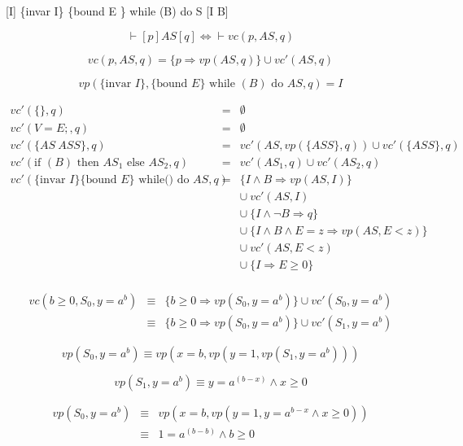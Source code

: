 \documentclass[12pt, a4paper]{book}
\begin{document}
  {[I] \{\textrm{invar }I\} \{\textrm{bound }E \}\textrm{ while }(B)\textrm{ do }S [I \land \lnot B]}

  $$\vdash [p] AS [q] \iff \vdash vc(p,AS,q)$$

  $$vc(p, AS, q) = \{p \Rightarrow vp(AS, q)\} \cup vc'(AS,q)$$

  $$vp(\{\textrm{invar }I\}, \{\textrm{bound }E\}\textrm{ while }(B)\textrm{ do }AS, q) = I$$

  \begin{eqnarray*}
      vc'(\{\}, q) & = & \emptyset \\
      vc'(V=E;, q) & = & \emptyset \\
      vc'(\{AS\ ASS\}, q) & = & vc'(AS, vp(\{ASS\}, q)) \cup vc'(\{ASS\}, q) \\
      vc'(\textrm{if }(B) \textrm{ then } {AS}_{1} \textrm{ else } {AS}_{2}, q) & = & vc'({AS}_{1}, q) \cup vc'({AS}_{2}, q) \\
      vc'(\{\textrm{invar }I\}\{\textrm{bound }E\} \textrm{ while() do }AS, q) & = & \{I\land B \Rightarrow vp(AS,I)\} \\
      & & \cup\ vc'(AS,I) \\
      & & \cup\ \{I \land\lnot B \Rightarrow q\} \\
      & & \cup\ \{I \land B \land E = z \Rightarrow vp(AS, E < z)\} \\
      & & \cup\ vc'(AS, E<z) \\
      & & \cup\ \{I \Rightarrow E \ge 0\} \\
  \end{eqnarray*}

  \begin{eqnarray*}
      vc(b \ge 0, S_{0}, y = a^{b}) & \equiv & \{ b \ge 0 \Rightarrow vp(S_{0}, y = a^{b}) \} \cup vc'(S_{0}, y = a^{b}) \\
      & \equiv & \{ b \ge 0 \Rightarrow vp(S_{0}, y = a^{b}) \} \cup vc'(S_{1}, y = a^{b})
  \end{eqnarray*}

  $$vp(S_{0}, y=a^{b}) \equiv vp(x=b, vp(y=1, vp(S_{1}, y=a^{b})))$$

  $$vp(S_{1}, y=a^{b}) \equiv y = a^{(b-x)} \land x \ge 0$$

  \begin{eqnarray*}
      vp(S_{0}, y=a^{b}) & \equiv & vp(x=b, vp(y=1, y = a^{b-x} \land x \ge 0)) \\
      & \equiv & 1 = a^{(b-b)} \land b \ge 0
  \end{eqnarray*}
\end{document}

